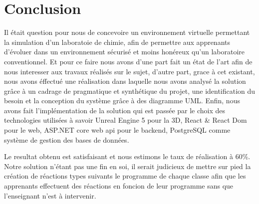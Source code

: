 \chapter*{Conclusion}

Il était question pour nous de concevoire un environnement virtuelle permettant la simulation d'un laboratoie de chimie, afin de permettre aux apprenants d'évoluer dans un environnement sécurisé et moins honéreux qu'un laboratoire conventionnel.
Et pour ce faire nous avons d'une part fait un état de l'art afin de nous interesser aux travaux réalisés sur le sujet, d'autre part, grace à cet existant, nous avons éffectué une réalisation dans laquelle nous avons analysé la solution grâce à un cadrage de pragmatique et synthétique du projet, une identification du besoin et la conception du système grâce à des diagramme UML. 
Enfin, nous avons fait l'implémentation de la solution qui est passée par le choix des technologies utilisées à savoir Unreal Engine 5 pour la 3D, React \& React Dom pour le web, ASP.NET core web api pour le backend, PostgreSQL comme système de gestion des bases de données.

Le resultat obtenu est satisfaisant et nous estimons le taux de réalisation à 60\%. Notre solution n'étant pas une fin en soi, il serait judicieux de mettre sur pied la création de réactions types suivants le programme de chaque classe afin que les apprenants effectuent des réactions en foncion de leur programme sans que l'enseignant n'est à intervenir.